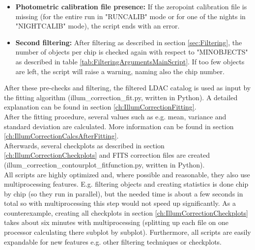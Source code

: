 \begin{itemize}
\item \textbf{Photometric calibration file presence:} If the zeropoint calibration file is missing (for the entire run in "RUNCALIB" mode or for one of the nights in "NIGHTCALIB" mode), the script ends with an error.
\item \textbf{Second filtering:} After filtering as described in section \ref{sec:Filtering}, the number of objects per chip is checked again with respect to "MINOBJECTS" as described in table \ref{tab:FilteringArgumentsMainScript}. If too few objects are left, the script will raise a warning, naming also the chip number.
\end{itemize}

After these pre-checks and filtering, the filtered LDAC catalog is used as input by the fitting algorithm (illum\_correction\_fit.py, written in Python). A detailed explanation can be found in section \ref{ch:IllumCorrectionFitting}.\\

After the fitting procedure, several values such as e.g. mean, variance and standard deviation are calculated. More information can be found in section \ref{ch:IllumCorrectionCalcsAfterFitting}.\\

Afterwards, several checkplots as described in section \ref{ch:IllumCorrectionCheckplots} and FITS correction files are created (illum\_correction\_contourplot\_fitfunction.py, written in Python).\\

All scripts are highly optimized and, where possible and reasonable, they also use multiprocessing features. E.g. filtering objects and creating statistics is done chip by chip (so they run in parallel), but the needed time is about a few seconds in total so with multiprocessing this step would not speed up significantly. As a counterexample, creating all checkplots in section \ref{ch:IllumCorrectionCheckplots} takes about six minutes with multiprocessing (splitting up each file on one processor calculating there subplot by subplot). Furthermore, all scripts are easily expandable for new features e.g. other filtering techniques or checkplots.



